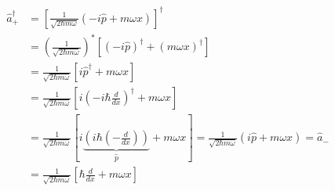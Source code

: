 \documentclass{article}
\begin{document}
\begin{enumerate}[label=(\alph*)]
\begin{align*}
		      \hat{a}_+^\dagger & = \left[\frac{1}{\sqrt{2 \hbar m \omega}} (-i \hat{p} + m \omega x)\right]^\dagger                                                                                                                                         \\
		                        & = \left(\frac{1}{\sqrt{2 \hbar m \omega}}\right)^* \left[(-i \hat{p})^\dagger + (m \omega x)^\dagger\right]                                                                                                                \\
		                        & = \frac{1}{\sqrt{2 \hbar m \omega}} \left[i \hat{p}^\dagger + m \omega x\right]                                                                                                                                            \\
		                        & = \frac{1}{\sqrt{2 \hbar m \omega}} \left[i \left(-i \hbar \frac{d}{dx}\right)^\dagger + m \omega x\right]                                                                                                                 \\
		                        & = \frac{1}{\sqrt{2 \hbar m \omega}} \left[i \underbrace{\left(i \hbar \left(-\frac{d}{dx}\right)\right)}_{\hat{p}} + m \omega x\right] = \frac{1}{\sqrt{2 \hbar m \omega}} \left(i \hat{p} + m \omega x\right) = \hat{a}_- \\
		                        & = \frac{1}{\sqrt{2 \hbar m \omega}} \left[\hbar \frac{d}{dx} + m \omega x\right]
	      \end{align*}
\end{enumerate}
\end{document}
